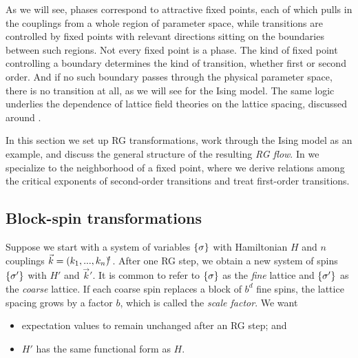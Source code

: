 As we will see, phases correspond to attractive fixed
points, each of which pulls in the couplings from a whole region of parameter
space, while transitions are controlled by fixed points with relevant directions
sitting on the boundaries between such regions. Not every fixed point is a phase.
The kind of fixed point controlling a boundary determines the kind of transition,
whether first or second order. And if no such boundary passes through the physical parameter
space, there is no transition at all, as we will see for the  Ising model.
The same logic underlies the dependence of lattice field theories on the lattice
spacing, discussed around .

In this section we set up RG transformations, work through the  Ising
model as an example, and discuss the general structure of the resulting
{\it RG flow}. In  we specialize to the
neighborhood of a fixed point, where we derive relations among the critical
exponents of second-order transitions and treat first-order transitions.

\subsection{Block-spin transformations}

Suppose we start with a system of variables $\left\{\sigma\right\}$ with Hamiltonian $H$
and $n$ couplings $\vec{k}=\trans{(k_1,...,k_n)}$. After one RG step, we obtain
a new system of spins $\left\{\sigma'\right\}$ with $H'$ and $\vec{k}'$.
It is common to refer to $\left\{\sigma\right\}$ as the {\it fine}
lattice and $\left\{\sigma'\right\}$ as the {\it coarse} lattice.
If each coarse spin replaces a block of $b^d$ fine spins, the lattice spacing
grows by a factor $b$, which is called the {\it scale factor}.
We want
\begin{itemize}
\item expectation values to remain unchanged after an RG step; and
\item $H'$ has the same functional form as $H$.
\end{itemize}

